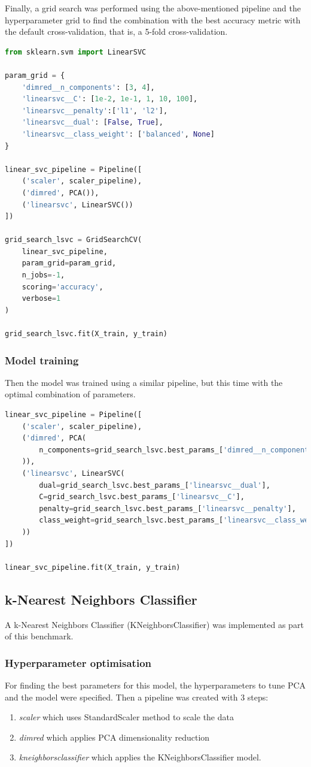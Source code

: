 \documentclass{article}
\begin{document}
Finally, a grid search was performed using the above-mentioned pipeline and the hyperparameter grid to find the combination with the best accuracy metric with the default cross-validation, that is, a 5-fold cross-validation.
\begin{lstlisting}[language=Python]
from sklearn.svm import LinearSVC

param_grid = {
    'dimred__n_components': [3, 4], 
    'linearsvc__C': [1e-2, 1e-1, 1, 10, 100],
    'linearsvc__penalty':['l1', 'l2'],
    'linearsvc__dual': [False, True],
    'linearsvc__class_weight': ['balanced', None]
}

linear_svc_pipeline = Pipeline([
    ('scaler', scaler_pipeline), 
    ('dimred', PCA()), 
    ('linearsvc', LinearSVC())
])

grid_search_lsvc = GridSearchCV(
    linear_svc_pipeline,
    param_grid=param_grid,
    n_jobs=-1,
    scoring='accuracy',
    verbose=1
)

grid_search_lsvc.fit(X_train, y_train)
\end{lstlisting}

\subsubsection{Model training}
Then the model was trained using a similar pipeline, but this time with the optimal combination of parameters.

\begin{lstlisting}[language=Python]
linear_svc_pipeline = Pipeline([
    ('scaler', scaler_pipeline), 
    ('dimred', PCA(
        n_components=grid_search_lsvc.best_params_['dimred__n_components']
    )),
    ('linearsvc', LinearSVC(
        dual=grid_search_lsvc.best_params_['linearsvc__dual'],
        C=grid_search_lsvc.best_params_['linearsvc__C'],
        penalty=grid_search_lsvc.best_params_['linearsvc__penalty'],
        class_weight=grid_search_lsvc.best_params_['linearsvc__class_weight']
    ))
])

linear_svc_pipeline.fit(X_train, y_train)
\end{lstlisting}

\subsection{k-Nearest Neighbors Classifier}
A k-Nearest Neighbors Classifier (KNeighborsClassifier) was implemented as part of this benchmark.

\subsubsection{Hyperparameter optimisation}
For finding the best parameters for this model, the hyperparameters to tune PCA and the model were specified. Then a pipeline was created with 3 steps:
\begin{enumerate}
\item \emph{scaler} which uses StandardScaler method to scale the data
\item \emph{dimred} which applies PCA dimensionality reduction
\item \emph{kneighborsclassifier} which applies the KNeighborsClassifier model.
\end{enumerate}
\end{document}

